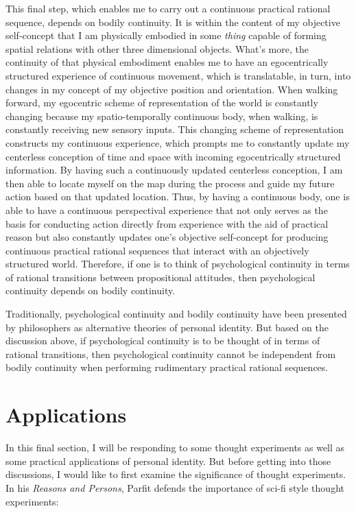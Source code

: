 This final step, which enables me to carry out a continuous practical
rational sequence, depends on bodily continuity. It is within the
content of my objective self-concept that I am physically embodied in
some \emph{thing} capable of forming spatial relations with other three
dimensional objects. What's more, the continuity of that physical
embodiment enables me to have an egocentrically structured experience of
continuous movement, which is translatable, in turn, into changes in my
concept of my objective position and orientation. When walking forward,
my egocentric scheme of representation of the world is constantly
changing because my spatio-temporally continuous body, when walking, is constantly receiving new
sensory inputs. This changing scheme of representation constructs my
continuous experience, which prompts me to constantly update my
centerless conception of time and space with incoming egocentrically
structured information. By having such a continuously updated centerless
conception, I am then able to locate myself on the map during the
process and guide my future action based on that updated location. Thus,
by having a continuous body, one is able to have a continuous
perspectival experience that not only serves as the basis for conducting
action directly from experience with the aid of practical reason but
also constantly updates one's objective self-concept for producing
continuous practical rational sequences that interact with an
objectively structured world. Therefore, if one is to think of
psychological continuity in terms of rational transitions between
propositional attitudes, then psychological continuity depends on bodily
continuity.

Traditionally, psychological continuity and bodily continuity have been
presented by philosophers as alternative theories of personal identity.
But based on the discussion above, if psychological continuity is to be
thought of in terms of rational transitions, then psychological
continuity cannot be independent from bodily continuity when performing
rudimentary practical rational sequences.

\section{Applications }


In this final section, I will be responding to some thought experiments
as well as some practical applications of personal identity. But before
getting into those discussions, I would like to first examine the
significance of thought experiments. In his \emph{Reasons and Persons},
Parfit defends the importance of sci-fi style thought experiments:

